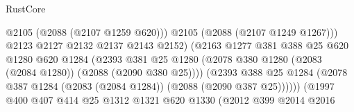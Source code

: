 \begin{lexlean}{RustCore}
\begin{coremodule}
                                                @2105
                                                (@2088 (@2107 @1259 @620)))
                                              @2105
                                              (@2088 (@2107 @1249 @1267)))
                                            @2123
                                            @2127
                                            @2132
                                            @2137
                                            @2143
                                            @2152)
                                          (@2163
                                            @1277
                                            @381
                                            @388
                                            @25
                                            @620
                                            @1280
                                            @620
                                            @1284
                                            (@2393
                                              @381
                                              @25
                                              @1280
                                              (@2078
                                                @380
                                                @1280
                                                (@2083 (@2084 @1280))
                                                (@2088 (@2090 @380 @25))))
                                            (@2393
                                              @388
                                              @25
                                              @1284
                                              (@2078
                                                @387
                                                @1284
                                                (@2083 (@2084 @1284))
                                                (@2088 (@2090 @387 @25))))))
                                        (@1997
                                          @400
                                          @407
                                          @414
                                          @25
                                          @1312
                                          @1321
                                          @620
                                          @1330
                                          (@2012
                                            @399
                                            @2014
                                            @2016

\end{coremodule}
\end{lexlean}
